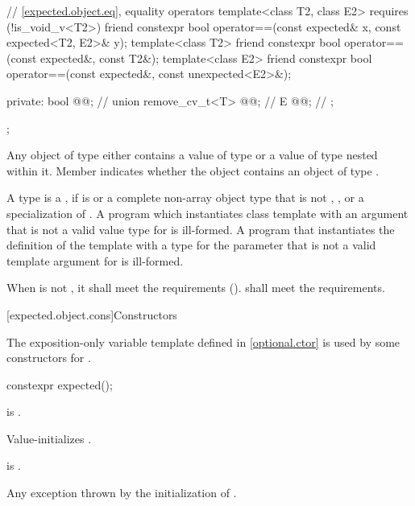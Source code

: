 \begin{codeblock}
{{    // \ref{expected.object.eq}, equality operators
    template<class T2, class E2> requires (!is_void_v<T2>)
      friend constexpr bool operator==(const expected& x, const expected<T2, E2>& y);
    template<class T2>
      friend constexpr bool operator==(const expected&, const T2&);
    template<class E2>
      friend constexpr bool operator==(const expected&, const unexpected<E2>&);

  private:
    bool @@;           // \expos
    union {
      remove_cv_t<T> @@;   // \expos
      E @@;               // \expos
    };
  };
}
\end{codeblock}

\pnum
Any object of type  either
contains a value of type  or
a value of type 
nested within it.
Member  indicates whether the  object
contains an object of type .

\pnum
A type  is a ,
if  is 
or a complete non-array object type that is not ,
,
or a specialization of .
A program which instantiates class template 
with an argument  that is not a valid value
type for  is ill-formed.
A program that instantiates
the definition of the template 
with a type for the  parameter
that is not a valid template argument for  is ill-formed.

\pnum
When  is not \cv{} , it shall meet
the  requirements ().
 shall meet
the  requirements.

[expected.object.cons]{Constructors}

\pnum
The exposition-only variable template 
defined in \ref{optional.ctor}
is used by some constructors for .

%
\begin{itemdecl}
constexpr expected();
\end{itemdecl}

\begin{itemdescr}
\pnum
\constraints
{} is .

\pnum
\effects
Value-initializes .

\pnum
\ensures
{} is .

\pnum
\throws
Any exception thrown by the initialization of .
\end{itemdescr}

